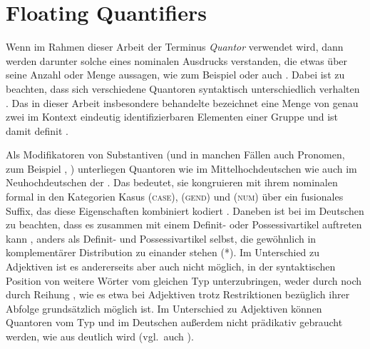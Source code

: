 
\section{Floating Quantifiers}
\label{sec:floatquant}

Wenn im Rahmen dieser Arbeit der Terminus \textit{Quantor} verwendet wird, dann
werden darunter solche  eines nominalen Ausdrucks
verstanden, die etwas über seine Anzahl oder Menge aussagen, wie zum Beispiel
 oder auch . Dabei ist zu beachten, dass
sich verschiedene Quantoren syntaktisch unterschiedlich verhalten
\autocites[27--28]{pittner1995}[11--12]{haspelmath1997}. Das in dieser Arbeit
insbesondere behandelte  bezeichnet eine Menge von genau
zwei im Kontext eindeutig identifizierbaren Elementen einer Gruppe
\autocite[vgl.][307]{keenan2006} und ist damit definit
\autocite[265--268]{lyons1999}.

Als Modifikatoren von Substantiven (und in manchen Fällen auch
Pronomen, zum Beispiel , ) unterliegen Quantoren
wie  im Mittelhochdeutschen wie auch
 im Neuhochdeutschen der
. Das bedeutet, sie kongruieren mit ihrem nominalen
 formal in den Kategorien Kasus (\textsc{case}), 
(\textsc{gend}) und  (\textsc{num}) über ein fusionales Suffix,
das diese Eigenschaften kombiniert kodiert \autocites(vgl.~auch
,
)[181--184]{ksw2}[772]{woellstein2022}. Daneben ist bei
 im Deutschen zu beachten, dass es zusammen mit
einem Definit- oder Possessivartikel auftreten kann
, anders als Definit- und Possessivartikel selbst, die
gewöhnlich in komplementärer Distribution zu
einander stehen (*). Im Unterschied zu
Adjektiven ist es andererseits aber auch nicht möglich,
in der syntaktischen Position von  weitere Wörter vom gleichen Typ
unterzubringen, weder durch   noch durch
Reihung , wie es etwa bei Adjektiven
trotz Restriktionen bezüglich ihrer Abfolge grundsätzlich möglich ist. Im
Unterschied zu Adjektiven können Quantoren vom Typ
 und  im Deutschen außerdem nicht
prädikativ gebraucht werden, wie aus  deutlich wird
(vgl.~auch \cite[181, Fußnote~1]{merchant1996}).

